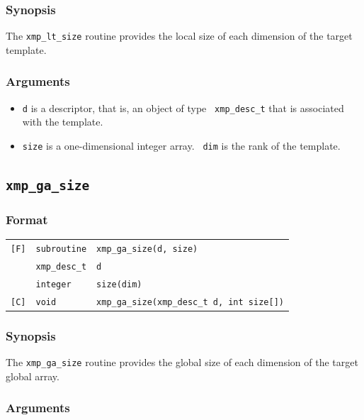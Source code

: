 \subsubsection*{Synopsis}

The {\tt xmp\_lt\_size} routine provides the local size of each dimension
of the target template.

\subsubsection*{Arguments}

\begin{itemize}
 \item {\tt d} is a descriptor, that is, an object of type {\tt
       xmp\_desc\_t} that is associated with the template.
 \item {\tt size} is a one-dimensional integer array. {\tt
       dim} is the rank of the template.
\end{itemize}


\subsection{\tt xmp\_ga\_size}

\subsubsection*{Format}

\begin{tabular}{lll}

\verb![F]!& {\tt subroutine}& {\tt xmp\_ga\_size(d, size)}\\
          & {\tt xmp\_desc\_t} & {\tt d}\\
          & {\tt integer} & {\tt size(dim)}\\

\verb![C]!&  {\tt void}& {\tt xmp\_ga\_size(xmp\_desc\_t d, int size[])}\\

\end{tabular}

\subsubsection*{Synopsis}

The {\tt xmp\_ga\_size} routine provides the global size of each
dimension of the target global array.

\subsubsection*{Arguments}

